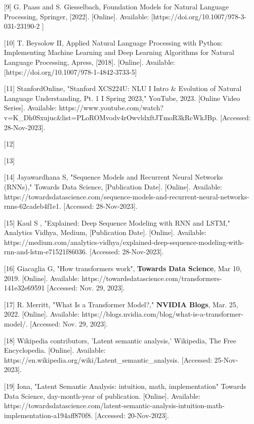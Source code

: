 [9] G. Paass and S. Giesselbach, Foundation Models for Natural Language Processing, Springer, [2022]. [Online]. Available: [https://doi.org/10.1007/978-3-031-23190-2 ]


[10] T. Beysolow II, Applied Natural Language Processing with Python: Implementing Machine Learning and Deep Learning Algorithms for Natural Language Processing, Apress, [2018]. [Online]. Available: [https://doi.org/10.1007/978-1-4842-3733-5]


[11] StanfordOnline, "Stanford XCS224U: NLU I Intro & Evolution of Natural Language Understanding, Pt. 1 I Spring 2023," YouTube, 2023. [Online Video Series]. Available: https://www.youtube.com/watch?v=K_Dh0Sxujuc&list=PLoROMvodv4rOwvldxftJTmoR3kRcWkJBp. [Accessed: 28-Nov-2023].

[12] 

[13] 


[14] Jayawardhana S, "Sequence Models and Recurrent Neural Networks (RNNs)," Towards Data Science, [Publication Date]. [Online]. Available: https://towardsdatascience.com/sequence-models-and-recurrent-neural-networks-rnns-62cadeb4f1e1. [Accessed: 28-Nov-2023].


[15] Kaul S , "Explained: Deep Sequence Modeling with RNN and LSTM," Analytics Vidhya, Medium, [Publication Date]. [Online]. Available: https://medium.com/analytics-vidhya/explained-deep-sequence-modeling-with-rnn-and-lstm-e71521f86036. [Accessed: 28-Nov-2023].

[16]  Giacaglia G, "How transformers work", \textbf{Towards Data Science}, Mar 10, 2019. [Online]. Available: https://towardsdatascience.com/transformers-141e32e69591 [Accessed: Nov. 29, 2023].



[17] R. Merritt, "What Is a Transformer Model?," \textbf{NVIDIA Blogs}, Mar. 25, 2022. [Online]. Available: https://blogs.nvidia.com/blog/what-is-a-transformer-model/. [Accessed: Nov. 29, 2023].

[18] Wikipedia contributors, 'Latent semantic analysis,' Wikipedia, The Free Encyclopedia. [Online]. Available: https://en.wikipedia.org/wiki/Latent_semantic_analysis. [Accessed: 25-Nov-2023].







[19]  Iona, "Latent Semantic Analysis: intuition, math, implementation" Towards Data Science, day-month-year of publication. [Online]. Available: https://towardsdatascience.com/latent-semantic-analysis-intuition-math-implementation-a194aff870f8. [Accessed: 20-Nov-2023].


